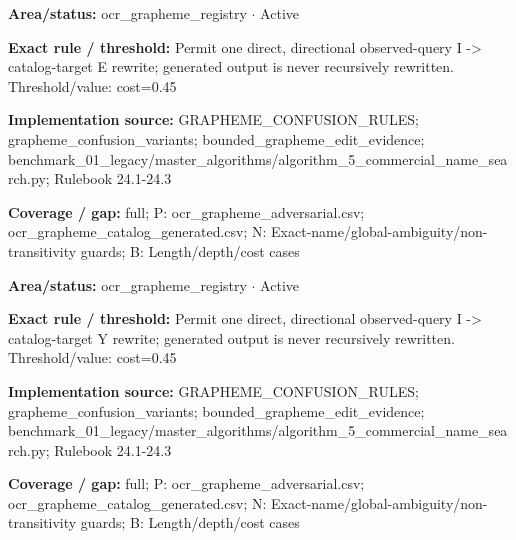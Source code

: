 \begin{tcolorbox}[enhanced,breakable,colback=white,colframe=Muted!45,boxrule=0.45pt,arc=1.5pt,left=6pt,right=6pt,top=5pt,bottom=5pt,title={\texttt{OCR-GRAPHEME-I-TO-E}},title after break={\texttt{OCR-GRAPHEME-I-TO-E}\ (continued)},fonttitle=\headingfont\bfseries\color{Navy},coltitle=Navy]
\textbf{Area/status:} ocr\_\allowbreak{}grapheme\_\allowbreak{}registry $\boldsymbol{\cdot}$ Active\par
\smallskip
\textbf{Exact rule / threshold:} Permit one direct, directional observed-query I -> catalog-target E rewrite; generated output is never recursively rewritten. Threshold/\allowbreak{}value: cost=0.45\par
\smallskip
\textbf{Implementation source:} GRAPHEME\_\allowbreak{}CONFUSION\_\allowbreak{}RULES; grapheme\_\allowbreak{}confusion\_\allowbreak{}variants; bounded\_\allowbreak{}grapheme\_\allowbreak{}edit\_\allowbreak{}evidence; benchmark\_\allowbreak{}01\_\allowbreak{}legacy/\allowbreak{}master\_\allowbreak{}algorithms/\allowbreak{}algorithm\_\allowbreak{}5\_\allowbreak{}commercial\_\allowbreak{}name\_\allowbreak{}search.py; Rulebook 24.1-24.3\par
\smallskip
\textbf{Coverage / gap:} full; P: ocr\_\allowbreak{}grapheme\_\allowbreak{}adversarial.csv; ocr\_\allowbreak{}grapheme\_\allowbreak{}catalog\_\allowbreak{}generated.csv; N: Exact-name/\allowbreak{}global-ambiguity/\allowbreak{}non-transitivity guards; B: Length/\allowbreak{}depth/\allowbreak{}cost cases
\end{tcolorbox}
\begin{tcolorbox}[enhanced,breakable,colback=white,colframe=Muted!45,boxrule=0.45pt,arc=1.5pt,left=6pt,right=6pt,top=5pt,bottom=5pt,title={\texttt{OCR-GRAPHEME-I-TO-Y}},title after break={\texttt{OCR-GRAPHEME-I-TO-Y}\ (continued)},fonttitle=\headingfont\bfseries\color{Navy},coltitle=Navy]
\textbf{Area/status:} ocr\_\allowbreak{}grapheme\_\allowbreak{}registry $\boldsymbol{\cdot}$ Active\par
\smallskip
\textbf{Exact rule / threshold:} Permit one direct, directional observed-query I -> catalog-target Y rewrite; generated output is never recursively rewritten. Threshold/\allowbreak{}value: cost=0.45\par
\smallskip
\textbf{Implementation source:} GRAPHEME\_\allowbreak{}CONFUSION\_\allowbreak{}RULES; grapheme\_\allowbreak{}confusion\_\allowbreak{}variants; bounded\_\allowbreak{}grapheme\_\allowbreak{}edit\_\allowbreak{}evidence; benchmark\_\allowbreak{}01\_\allowbreak{}legacy/\allowbreak{}master\_\allowbreak{}algorithms/\allowbreak{}algorithm\_\allowbreak{}5\_\allowbreak{}commercial\_\allowbreak{}name\_\allowbreak{}search.py; Rulebook 24.1-24.3\par
\smallskip
\textbf{Coverage / gap:} full; P: ocr\_\allowbreak{}grapheme\_\allowbreak{}adversarial.csv; ocr\_\allowbreak{}grapheme\_\allowbreak{}catalog\_\allowbreak{}generated.csv; N: Exact-name/\allowbreak{}global-ambiguity/\allowbreak{}non-transitivity guards; B: Length/\allowbreak{}depth/\allowbreak{}cost cases
\end{tcolorbox}
